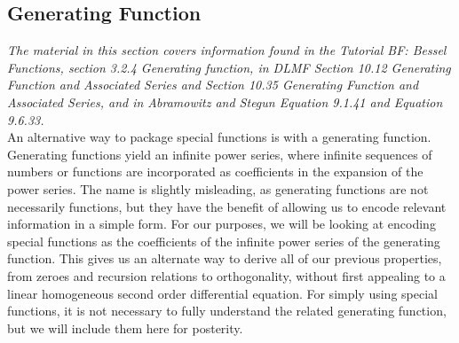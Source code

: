 \documentclass[11pt]{report}
\newcommand{\fpar}[1]{\left({#1}\right)}
\begin{document}
    

        
\subsection{Generating Function}

\emph{The material in this section covers information found in the Tutorial BF: Bessel Functions, section 3.2.4 Generating function, in DLMF Section 10.12 Generating Function and Associated Series and Section 10.35 Generating Function and Associated Series, and in Abramowitz and Stegun Equation 9.1.41 and Equation 9.6.33.}\\

An alternative way to package special functions is with a generating function. Generating functions yield an infinite power series, where infinite sequences of numbers or functions are incorporated as coefficients in the expansion of the power series. The name is slightly misleading, as generating functions are not necessarily functions, but they have the benefit of allowing us to encode relevant information in a simple form. For our purposes, we will be looking at encoding special functions as the coefficients of the infinite power series of the generating function. This gives us an alternate way to derive all of our previous properties, from zeroes and recursion relations to orthogonality, without first appealing to a linear homogeneous second order differential equation. For simply using special functions, it is not necessary to fully understand the related generating function, but we will include them here for posterity.\\

\end{document}
